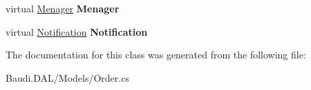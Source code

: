\begin{DoxyCompactItemize}
\item 
\hypertarget{class_baudi_1_1_d_a_l_1_1_models_1_1_order_a9b35a260c2153ee63f2bb97b690d60f1}{}virtual \hyperlink{class_baudi_1_1_d_a_l_1_1_models_1_1_menager}{Menager} {\bfseries Menager}\label{class_baudi_1_1_d_a_l_1_1_models_1_1_order_a9b35a260c2153ee63f2bb97b690d60f1}

\item 
\hypertarget{class_baudi_1_1_d_a_l_1_1_models_1_1_order_a8e11b30ed98dd97b927e261a421b2583}{}virtual \hyperlink{class_baudi_1_1_d_a_l_1_1_models_1_1_notification}{Notification} {\bfseries Notification}\label{class_baudi_1_1_d_a_l_1_1_models_1_1_order_a8e11b30ed98dd97b927e261a421b2583}

\end{DoxyCompactItemize}


The documentation for this class was generated from the following file\+:\begin{DoxyCompactItemize}
\item 
Baudi.\+D\+A\+L/\+Models/Order.\+cs\end{DoxyCompactItemize}
